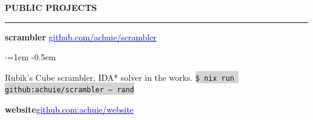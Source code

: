 \documentclass[10pt, a4paper]{article}
\newenvironment{aSection}[1]{
    \medskip \textbf{\uppercase{#1}}
    \smallskip
    \hrule
    \begin{list}{}{
            \setlength{\leftmargin}{1.5em}
        }
    \item[]
    }{
    \end{list}
}
\newenvironment{projSubsection}[2]{
    {#1} \hfill {#2}
    \smallskip
    \begin{list}{$\cdot$}{\leftmargin=1em}
    \itemsep -0.5em \vspace{-0.5em}
    }{
    \end{list}
    \vspace{0.5em}
}
\begin{document}
\begin{aSection}{Public Projects}
    \begin{projSubsection}
        {\textbf{scrambler}}
        {\href{https://www.github.com/achuie/scrambler}{\textcolor{blue}{\underline{github.com/achuie/scrambler}}}}
    \item[] Rubik's Cube scrambler, IDA* solver in the works.
        \colorbox{lightgray}{\texttt{\$ nix run github:achuie/scrambler -- rand}}
    \end{projSubsection}

    \textbf{website}\hfill\href{https://www.github.com/achuie/website}{\textcolor{blue}{\underline{github.com:achuie/website}}}
\end{aSection}
\end{document}
